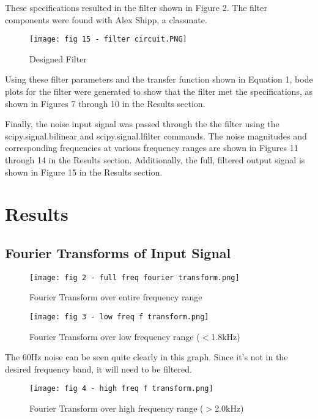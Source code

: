 \documentclass[12pt]{article}
\begin{document}
These specifications resulted in the filter shown in Figure 2. The filter components were found with Alex Shipp, a classmate.

\begin{figure}[h!]
    \centering
    \texttt{[image: fig 15 - filter circuit.PNG]}
    \caption{Designed Filter}
\end{figure}

Using these filter parameters and the transfer function shown in Equation 1, bode plots for the filter were generated to show that the filter met the specifications, as shown in Figures 7 through 10 in the Results section.

Finally, the noise input signal was passed through the the filter using the scipy.signal.bilinear and scipy.signal.lfilter commands. The noise magnitudes and corresponding frequencies at various frequency ranges are shown in Figures 11 through 14 in the Results section. Additionally, the full, filtered output signal is shown in Figure 15 in the Results section.

\newpage

\section{Results}

\subsection{Fourier Transforms of Input Signal}

\begin{figure}[h!]
    \centering
    \texttt{[image: fig 2 - full freq fourier transform.png]}
    \caption{Fourier Transform over entire frequency range}
\end{figure}

\begin{figure}[h!]
    \centering
    \texttt{[image: fig 3 - low freq f transform.png]}
    \caption{Fourier Transform over low frequency range ($<$1.8kHz)}
\end{figure}

The 60Hz noise can be seen quite clearly in this graph. Since it's not in the desired frequency band, it will need to be filtered.

\newpage

\begin{figure}[h!]
    \centering
    \texttt{[image: fig 4 - high freq f transform.png]}
    \caption{Fourier Transform over high frequency range ($>$2.0kHz)}
\end{figure}
\end{document}
